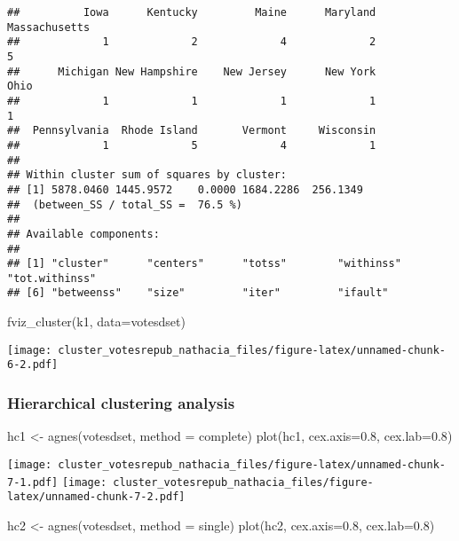 \documentclass[
]{article}
\newenvironment{Shaded}{\begin{snugshade}}{\end{snugshade}}
\newcommand{\AttributeTok}[1]{\textcolor[rgb]{0.77,0.63,0.00}{#1}}
\newcommand{\FloatTok}[1]{\textcolor[rgb]{0.00,0.00,0.81}{#1}}
\newcommand{\FunctionTok}[1]{\textcolor[rgb]{0.00,0.00,0.00}{#1}}
\newcommand{\NormalTok}[1]{#1}
\newcommand{\OtherTok}[1]{\textcolor[rgb]{0.56,0.35,0.01}{#1}}
\newcommand{\StringTok}[1]{\textcolor[rgb]{0.31,0.60,0.02}{#1}}
\begin{document}
\begin{verbatim}
##          Iowa      Kentucky         Maine      Maryland Massachusetts 
##             1             2             4             2             5 
##      Michigan New Hampshire    New Jersey      New York          Ohio 
##             1             1             1             1             1 
##  Pennsylvania  Rhode Island       Vermont     Wisconsin 
##             1             5             4             1 
## 
## Within cluster sum of squares by cluster:
## [1] 5878.0460 1445.9572    0.0000 1684.2286  256.1349
##  (between_SS / total_SS =  76.5 %)
## 
## Available components:
## 
## [1] "cluster"      "centers"      "totss"        "withinss"     "tot.withinss"
## [6] "betweenss"    "size"         "iter"         "ifault"
\end{verbatim}

\begin{Shaded}
\begin{Highlighting}[]
\FunctionTok{fviz\_cluster}\NormalTok{(k1, }\AttributeTok{data=}\NormalTok{votesdset)}
\end{Highlighting}
\end{Shaded}

\texttt{[image: cluster\_votesrepub\_nathacia\_files/figure-latex/unnamed-chunk-6-2.pdf]}

\hypertarget{hierarchical-clustering-analysis}{%
\subsubsection{Hierarchical clustering
analysis}\label{hierarchical-clustering-analysis}}

\begin{Shaded}
\begin{Highlighting}[]
\NormalTok{hc1 }\OtherTok{\textless{}{-}} \FunctionTok{agnes}\NormalTok{(votesdset, }\AttributeTok{method =} \StringTok{\textquotesingle{}complete\textquotesingle{}}\NormalTok{) }
\FunctionTok{plot}\NormalTok{(hc1, }\AttributeTok{cex.axis=}\FloatTok{0.8}\NormalTok{, }\AttributeTok{cex.lab=}\FloatTok{0.8}\NormalTok{)}
\end{Highlighting}
\end{Shaded}

\texttt{[image: cluster\_votesrepub\_nathacia\_files/figure-latex/unnamed-chunk-7-1.pdf]}
\texttt{[image: cluster\_votesrepub\_nathacia\_files/figure-latex/unnamed-chunk-7-2.pdf]}

\begin{Shaded}
\begin{Highlighting}[]
\NormalTok{hc2 }\OtherTok{\textless{}{-}} \FunctionTok{agnes}\NormalTok{(votesdset, }\AttributeTok{method =} \StringTok{\textquotesingle{}single\textquotesingle{}}\NormalTok{)}
\FunctionTok{plot}\NormalTok{(hc2, }\AttributeTok{cex.axis=}\FloatTok{0.8}\NormalTok{, }\AttributeTok{cex.lab=}\FloatTok{0.8}\NormalTok{)}
\end{Highlighting}
\end{Shaded}
\end{document}
